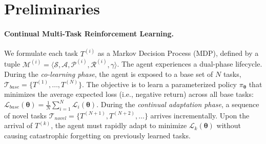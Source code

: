 \documentclass{article}
\begin{document}
\begin{table}[h]
\centering
{}
\caption{Comparison of evaluated architectures. SMP uniquely achieves strict parameter isolation and continual knowledge preservation while enabling rapid adaptation via structural transfer.}
\label{tab:comparison}
\end{table}


\section{Preliminaries}

\paragraph{Continual Multi-Task Reinforcement Learning.} 
We formulate each task $T^{(i)}$ as a Markov Decision Process (MDP), defined by a tuple $\mathcal{M}^{(i)} = \langle \mathcal{S}, \mathcal{A}, \mathcal{P}^{(i)}, \mathcal{R}^{(i)}, \gamma \rangle$. 
The agent experiences a dual-phase lifecycle. 
During the \emph{co-learning phase}, the agent is exposed to a base set of $N$ tasks, $\mathcal{T}_{base} = \{T^{(1)}, \dots, T^{(N)}\}$. 
The objective is to learn a parameterized policy $\pi_{\bm{\theta}}$ that minimizes the average expected loss (i.e., negative return) across all base tasks: $\mathcal{L}_{base}(\bm{\theta}) = \frac{1}{N} \sum_{i=1}^{N} \mathcal{L}_i(\bm{\theta})$.
During the \emph{continual adaptation phase}, a sequence of novel tasks $\mathcal{T}_{novel} = \{T^{(N+1)}, T^{(N+2)}, \dots\}$ arrives incrementally. 
Upon the arrival of $T^{(k)}$, the agent must rapidly adapt to minimize $\mathcal{L}_k(\bm{\theta})$ without causing catastrophic forgetting on previously learned tasks.
\end{document}
